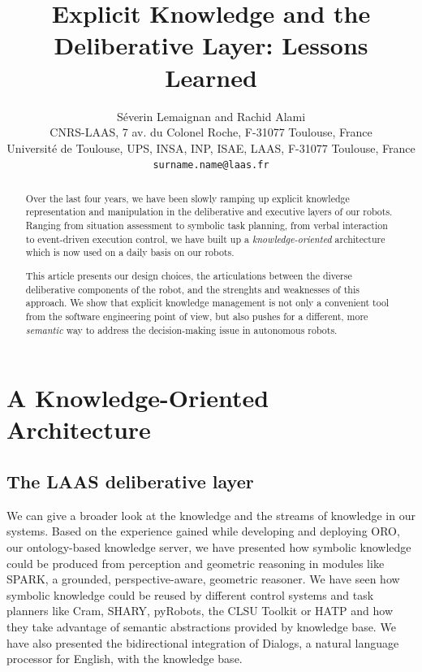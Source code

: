 \documentclass[letterpaper, 10 pt, conference]{ieeeconf}  %
\title{\LARGE \bf
Explicit Knowledge and the Deliberative Layer: Lessons Learned
}
\author{Séverin Lemaignan and Rachid Alami\\
CNRS-LAAS, 7 av. du Colonel Roche, F-31077 Toulouse, France\\
Université de Toulouse, UPS, INSA, INP, ISAE, LAAS, F-31077 Toulouse, France\\
{\tt surname.name@laas.fr}
}
\begin{document}
\maketitle
\thispagestyle{empty}
\pagestyle{empty}


\begin{abstract}

Over the last four years, we have been slowly ramping up explicit knowledge
representation and manipulation in the deliberative and executive layers of our
robots. Ranging from situation assessment to symbolic task planning, from
verbal interaction to event-driven execution control, we have built up a
\emph{knowledge-oriented} architecture which is now used on a daily basis on our
robots.

This article presents our design choices, the articulations between the diverse
deliberative components of the robot, and the strenghts and weaknesses of this
approach. We show that explicit knowledge management is not only a convenient
tool from the software engineering point of view, but also pushes for a
different, more \emph{semantic} way to address the decision-making issue in
autonomous robots.

\end{abstract}


\section{A Knowledge-Oriented Architecture}

\subsection{The LAAS deliberative layer}

We can give a broader look at the knowledge and the streams of knowledge in our
systems.  Based on the experience gained while developing and deploying {\sc
ORO}, our ontology-based knowledge server, we have presented how symbolic
knowledge could be produced from perception and geometric reasoning in modules
like {\sc SPARK}, a grounded, perspective-aware, geometric reasoner. We have
seen how symbolic knowledge could be reused by different control systems and
task planners like {\sc Cram}, {\sc SHARY}, {\sc pyRobots}, the {\sc CLSU
Toolkit} or {\sc HATP} and how they take advantage of semantic abstractions
provided by knowledge base. We have also presented the bidirectional
integration of {\sc Dialogs}, a natural language processor for English, with
the knowledge base.
\end{document}
